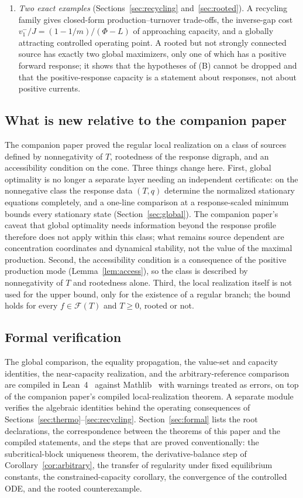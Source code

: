 \documentclass[11pt,a4paper]{article}
\theoremstyle{plain}
\theoremstyle{definition}
\theoremstyle{remark}
\numberwithin{equation}{section}
\newcommand{\cone}{\mathcal{F}}
\begin{document}
\begin{enumerate}[label=(\Alph*)]
\item \emph{Two exact examples} (Sections~\ref{sec:recycling} and~\ref{sec:rooted}). A recycling family gives closed-form production--turnover trade-offs, the inverse-gap cost $v_1^-/J=(1-1/m)/(\Phi-L)$ of approaching capacity, and a globally attracting controlled operating point. A rooted but not strongly connected source has exactly two global maximizers, only one of which has a positive forward response; it shows that the hypotheses of (B) cannot be dropped and that the positive-response capacity is a statement about responses, not about positive currents.
\end{enumerate}

\subsection{What is new relative to the companion paper}
The companion paper proved the regular local realization on a class of sources defined by nonnegativity of $T$, rootedness of the response digraph, and an accessibility condition on the cone. Three things change here. First, global optimality is no longer a separate layer needing an independent certificate: on the nonnegative class the response data $(T,q)$ determine the normalized stationary equations completely, and a one-line comparison at a response-scaled minimum bounds every stationary state (Section~\ref{sec:global}). The companion paper's caveat that global optimality needs information beyond the response profile therefore does not apply within this class; what remains source dependent are concentration coordinates and dynamical stability, not the value of the maximal production. Second, the accessibility condition is a consequence of the positive production mode (Lemma~\ref{lem:access}), so the class is described by nonnegativity of $T$ and rootedness alone. Third, the local realization itself is not used for the upper bound, only for the existence of a regular branch; the bound holds for every $f\in\cone(T)$ and $T\ge0$, rooted or not.

\subsection{Formal verification}
The global comparison, the equality propagation, the value-set and capacity identities, the near-capacity realization, and the arbitrary-reference comparison are compiled in Lean~4~\citep{demoura2021} against Mathlib~\citep{mathlib2020} with warnings treated as errors, on top of the companion paper's compiled local-realization theorem. A separate module verifies the algebraic identities behind the operating consequences of Sections~\ref{sec:thermo}--\ref{sec:recycling}. Section~\ref{sec:formal} lists the root declarations, the correspondence between the theorems of this paper and the compiled statements, and the steps that are proved conventionally: the subcritical-block uniqueness theorem, the derivative-balance step of Corollary~\ref{cor:arbitrary}, the transfer of regularity under fixed equilibrium constants, the constrained-capacity corollary, the convergence of the controlled ODE, and the rooted counterexample.
\end{document}
